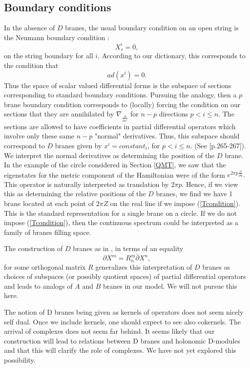 \documentclass[a4paper,11pt]{amsart}
\newcommand{\db}{\bar{\partial}}
\begin{document}
\subsection{Boundary conditions}\label{BC}
In the absence of $D$ branes, the usual boundary condition on an open string is 
the Neumann boundary condition :
$$X_s^i = 0,$$
on the string boundary for all $i$. According to our dictionary, this
corresponds to the condition that 
$$ad(x^i) = 0.$$
Thus the space of scalar valued differential forms is the subspace 
of sections corresponding to standard boundary conditions. Pursuing the analogy,
then a $p$ brane boundary condition corresponds to (locally) forcing the
condition on our sections that they are annihilated by 
$\nabla_{\frac{\partial}{\partial x^i}}$ for $n-p$ directions $p<i\leq n$. The
 sections are
allowed to have coefficients in partial differential operators which involve 
only these same $n-p$ "normal" derivatives. Thus, this 
subspace should correspond to $D$ branes given by $x^i = constant_i$, for 
$p<i\leq n$. (See \cite{P}[p.265-267]). 
We interpret the normal derivatives as determining the position of the
$D$ brane. In the example of the circle considered in Section \ref{QMT}, we saw that the
eigenstates for the metric component of the Hamiltonian were of the form 
$e^{2\pi p\frac{\partial}{\partial u}}.$ This operator is naturally interpreted
as translation by $2\pi p$. Hence, if we view this as determining the relative
positions of the $D$ branes, we find we have 1 brane located at each point of
$2\pi Z$ on the real line if we impose (\ref{Tcondition}). This is the standard
representation for a single brane on a circle. If we do not impose
(\ref{Tcondition}), then the continuous spectrum could be interpreted as a 
family of branes filling space. 

The construction of $D$ branes as in \cite{OOY}, in terms of an equality 
\begin{equation}\label{Oz}
\partial X^m = R^m_n\db X^n,
\end{equation} 
for some orthogonal matrix $R$ generalizes this interpretation of $D$
 branes as choices of subspaces (or possibly quotient spaces) of partial
  differential operators and leads to analogs of $A$ and $B$ branes in 
  our model. We will not pursue this here. 

The notion of D branes being given as kernels of operators does not seem nicely 
self dual. Once we include kernels, one should expect to see also cokernels. 
The arrival of complexes does not seem far behind. It seems likely that our
construction will lead to relations between D branes and holonomic D-modules and
that this will clarify the role of complexes. We have not yet explored this 
possibility.
\end{document}
